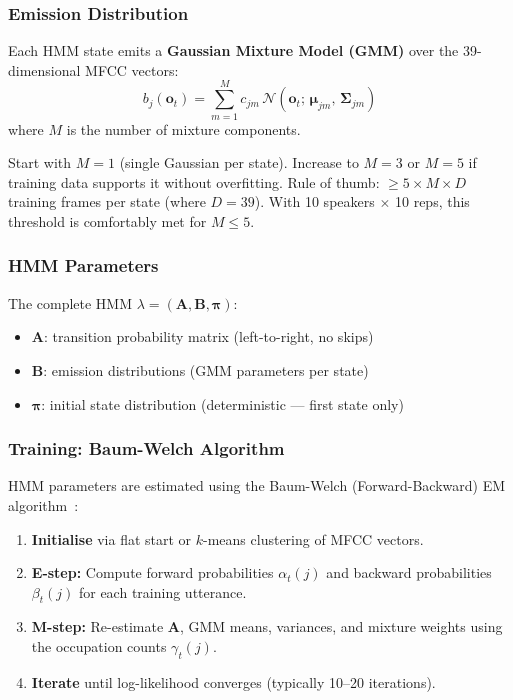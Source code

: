 \documentclass[12pt,a4paper]{article}
\newcommand{\mat}[1]{\mathbf{#1}}
\begin{document}
\subsubsection{Emission Distribution}

Each HMM state emits a \textbf{Gaussian Mixture Model (GMM)} over the 39-dimensional
MFCC vectors:
\[
  b_j(\mathbf{o}_t)
  = \sum_{m=1}^{M} c_{jm}\,
    \mathcal{N}\!\left(\mathbf{o}_t;\,\boldsymbol{\mu}_{jm},\,
    \boldsymbol{\Sigma}_{jm}\right)
\]
where $M$ is the number of mixture components.

\begin{notebox}
Start with $M=1$ (single Gaussian per state). Increase to $M=3$ or $M=5$
if training data supports it without overfitting.
Rule of thumb: $\geq 5 \times M \times D$ training frames per state
(where $D=39$). With 10 speakers $\times$ 10 reps, this threshold is comfortably
met for $M \leq 5$.
\end{notebox}

\subsubsection{HMM Parameters}

The complete HMM $\lambda = (\mat{A}, \mat{B}, \boldsymbol{\pi})$:
\begin{itemize}[leftmargin=1.5em, itemsep=2pt]
  \item $\mat{A}$: transition probability matrix (left-to-right, no skips)
  \item $\mat{B}$: emission distributions (GMM parameters per state)
  \item $\boldsymbol{\pi}$: initial state distribution
        (deterministic --- first state only)
\end{itemize}

\subsubsection{Training: Baum-Welch Algorithm}

HMM parameters are estimated using the Baum-Welch (Forward-Backward) EM
algorithm~\cite{baum1972inequality}:

\begin{enumerate}[leftmargin=1.5em, itemsep=2pt]
  \item \textbf{Initialise} via flat start or $k$-means clustering of MFCC vectors.
  \item \textbf{E-step:} Compute forward probabilities $\alpha_t(j)$ and backward
        probabilities $\beta_t(j)$ for each training utterance.
  \item \textbf{M-step:} Re-estimate $\mat{A}$, GMM means, variances, and
        mixture weights using the occupation counts $\gamma_t(j)$.
  \item \textbf{Iterate} until log-likelihood converges (typically 10--20 iterations).
\end{enumerate}
\end{document}
